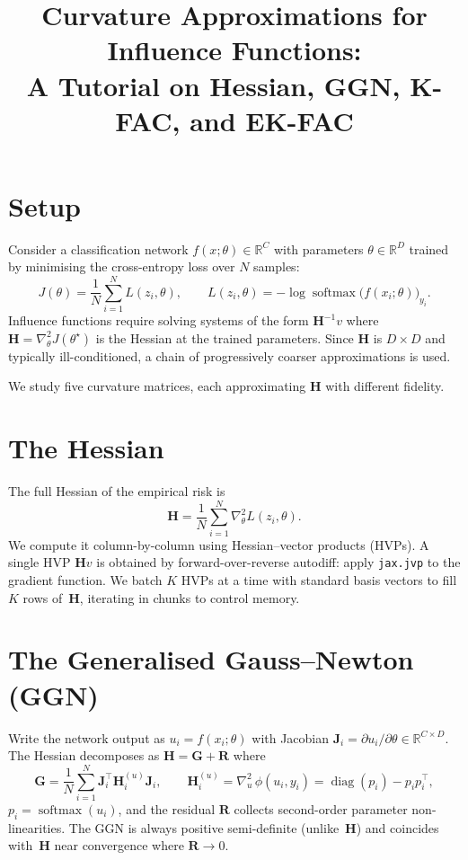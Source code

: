 \documentclass[11pt]{article}
\title{Curvature Approximations for Influence Functions:\\A Tutorial on Hessian, GGN, K-FAC, and EK-FAC}
\author{}
\date{}
\DeclareMathOperator{\diag}{diag}
\DeclareMathOperator{\softmax}{softmax}
\newcommand{\R}{\mathbb{R}}
\begin{document}
\maketitle

\section{Setup}

Consider a classification network $f(x;\theta)\in\R^C$ with parameters
$\theta\in\R^D$ trained by minimising the cross-entropy loss over $N$ samples:
\[
  J(\theta) = \frac{1}{N}\sum_{i=1}^{N} L(z_i,\theta),
  \qquad
  L(z_i,\theta) = -\log \softmax\!\bigl(f(x_i;\theta)\bigr)_{y_i}.
\]
Influence functions require solving systems of the form $\mathbf{H}^{-1}v$
where $\mathbf{H}=\nabla^2_\theta J(\theta^\star)$ is the Hessian at the
trained parameters. Since $\mathbf{H}$ is $D\times D$ and typically
ill-conditioned, a chain of progressively coarser approximations is used.

We study five curvature matrices, each approximating $\mathbf{H}$ with
different fidelity.

\section{The Hessian}

The full Hessian of the empirical risk is
\[
  \mathbf{H} = \frac{1}{N}\sum_{i=1}^{N}\nabla^2_\theta L(z_i,\theta).
\]
We compute it column-by-column using Hessian--vector products (HVPs).
A single HVP $\mathbf{H}v$ is obtained by forward-over-reverse
autodiff: apply \texttt{jax.jvp} to the gradient function.
We batch $K$ HVPs at a time with standard basis vectors to fill $K$
rows of~$\mathbf{H}$, iterating in chunks to control memory.

\section{The Generalised Gauss--Newton (GGN)}

Write the network output as $u_i = f(x_i;\theta)$ with Jacobian
$\mathbf{J}_i = \partial u_i/\partial\theta \in \R^{C\times D}$.
The Hessian decomposes as $\mathbf{H} = \mathbf{G} + \mathbf{R}$
where
\[
  \mathbf{G}
  = \frac{1}{N}\sum_{i=1}^{N}
    \mathbf{J}_i^\top \mathbf{H}_i^{(u)} \mathbf{J}_i,
  \qquad
  \mathbf{H}_i^{(u)}
  = \nabla_u^2\,\phi(u_i,y_i)
  = \diag(p_i) - p_i p_i^\top,
\]
$p_i = \softmax(u_i)$, and the residual $\mathbf{R}$ collects
second-order parameter non-linearities.
The GGN is always positive semi-definite (unlike~$\mathbf{H}$) and
coincides with~$\mathbf{H}$ near convergence where $\mathbf{R}\to 0$.
\end{document}
